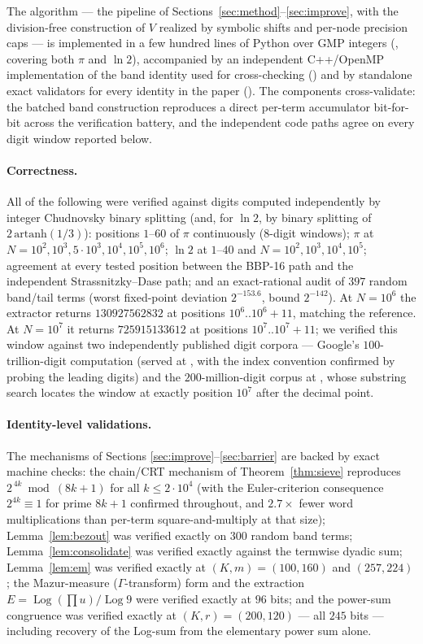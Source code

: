 \documentclass[11pt]{article}
\theoremstyle{remark}
\theoremstyle{definition}
\begin{document}
The algorithm --- the pipeline of
Sections~\ref{sec:method}--\ref{sec:improve}, with the division-free
construction of $V$ realized by symbolic shifts and per-node precision
caps --- is implemented in a few hundred lines of Python over GMP
integers (, covering both $\pi$ and
$\ln2$), accompanied by an independent C++/OpenMP implementation of the
band identity used for cross-checking ()
and by standalone exact validators for every identity in the paper
(). The components cross-validate: the batched band
construction reproduces a direct per-term accumulator bit-for-bit
across the verification battery, and the independent code paths agree
on every digit window reported below.

\paragraph{Correctness.}
All of the following were verified against digits computed independently by
integer Chudnovsky binary splitting (and, for $\ln 2$, by binary splitting
of $2\,\mathrm{artanh}(1/3)$):
positions $1$--$60$ of $\pi$ continuously (8-digit windows);
$\pi$ at $N=10^{2},10^{3},5\cdot10^{3},10^{4},10^{5},10^{6}$;
$\ln2$ at $1$--$40$ and $N=10^{2},10^{3},10^{4},10^{5}$;
agreement at every tested position between the BBP-16 path and the
independent Strassnitzky--Dase path;
and an exact-rational audit of $397$ random band/tail terms (worst
fixed-point deviation $2^{-153.6}$, bound $2^{-142}$).
At $N=10^{6}$ the extractor returns
$130927562832$ at positions $10^{6}..10^{6}{+}11$, matching the reference.
At $N=10^{7}$ it returns $725915133612$ at positions
$10^{7}..10^{7}{+}11$; we verified this window against two independently
published digit corpora --- Google's $100$-trillion-digit computation
(served at , with the index convention confirmed by
probing the leading digits) and the $200$-million-digit corpus at
, whose substring search locates the window at exactly
position $10^{7}$ after the decimal point.

\paragraph{Identity-level validations.}
The mechanisms of Sections \ref{sec:improve}--\ref{sec:barrier} are backed
by exact machine checks: the chain/CRT mechanism of
Theorem~\ref{thm:sieve} reproduces $2^{\,4k}\bmod(8k+1)$ for all
$k\le 2\cdot10^{4}$ (with the Euler-criterion consequence
$2^{4k}\equiv1$ for prime $8k+1$ confirmed throughout, and $2.7\times$
fewer word multiplications than per-term square-and-multiply at that
size); Lemma~\ref{lem:bezout} was verified exactly on $300$ random band
terms; Lemma~\ref{lem:consolidate} was verified exactly against the
termwise dyadic sum; Lemma~\ref{lem:em} was verified exactly at
$(K,m)=(100,160)$ and $(257,224)$; the Mazur-measure ($\Gamma$-transform)
form and the extraction $E=\operatorname{Log}(\prod u)/\operatorname{Log}9$
were verified exactly at $96$ bits; and the power-sum congruence was
verified exactly at $(K,r)=(200,120)$ --- all $245$ bits --- including
recovery of the Log-sum from the elementary power sum alone.
\end{document}
